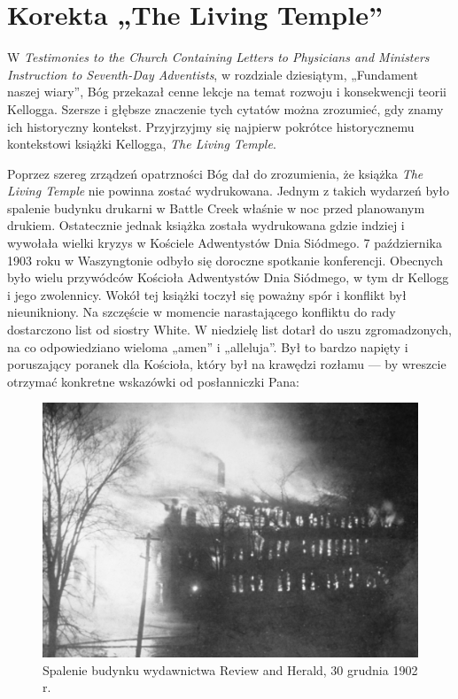 \chapter{Korekta „The Living Temple”}

W \textit{Testimonies to the Church Containing Letters to Physicians and Ministers Instruction to Seventh-Day Adventists}, w rozdziale dziesiątym, „Fundament naszej wiary”, Bóg przekazał cenne lekcje na temat rozwoju i konsekwencji teorii Kellogga. Szersze i głębsze znaczenie tych cytatów można zrozumieć, gdy znamy ich historyczny kontekst. Przyjrzyjmy się najpierw pokrótce historycznemu kontekstowi książki Kellogga, \textit{The Living Temple}.

Poprzez szereg zrządzeń opatrzności Bóg dał do zrozumienia, że książka \textit{The Living Temple} nie powinna zostać wydrukowana. Jednym z takich wydarzeń było spalenie budynku drukarni w Battle Creek właśnie w noc przed planowanym drukiem. Ostatecznie jednak książka została wydrukowana gdzie indziej i wywołała wielki kryzys w Kościele Adwentystów Dnia Siódmego. 7 października 1903 roku w Waszyngtonie odbyło się doroczne spotkanie konferencji. Obecnych było wielu przywódców Kościoła Adwentystów Dnia Siódmego, w tym dr Kellogg i jego zwolennicy. Wokół tej książki toczył się poważny spór i konflikt był nieunikniony. Na szczęście w momencie narastającego konfliktu do rady dostarczono list od siostry White. W niedzielę list dotarł do uszu zgromadzonych, na co odpowiedziano wieloma „amen” i „alleluja”. Był to bardzo napięty i poruszający poranek dla Kościoła, który był na krawędzi rozłamu — by wreszcie otrzymać konkretne wskazówki od posłanniczki Pana:

\begin{figure}[h]
    \centering
    \includegraphics[width=1\linewidth]{images/review-and-herlad.jpg}
    \caption*{Spalenie budynku wydawnictwa Review and Herald, 30 grudnia 1902 r.}
    \label{fig:review-and-herald}
\end{figure}

